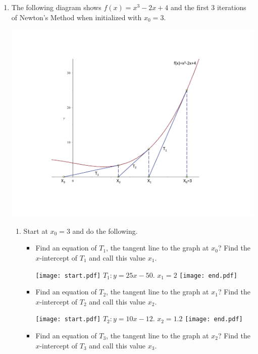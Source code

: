 \documentclass[12pt]{article}
\begin{document}
\begin{enumerate}

\item The following diagram shows $f(x)=x^3-2x+4$ and the first 3 iterations of Newton's Method when initialized with $x_0=3$.

\begin{center}
\includegraphics[scale=0.5]{newton1.pdf}
\end{center}

\begin{enumerate}

\item Start at $x_0=3$ and do the following.  

\begin{itemize}

\item Find an equation of $T_1$, the tangent line to the graph at $x_0$?  Find the $x$-intercept of $T_1$ and call this value $x_1$. 

\texttt{[image: start.pdf]}
{{$T_1: y=25x-50$. $x_1=2$}}
\texttt{[image: end.pdf]}


\item Find an equation of $T_2$, the tangent line to the graph at $x_1$?  Find the $x$-intercept of $T_2$ and call this value $x_2$.

\texttt{[image: start.pdf]}
{{$T_2: y=10x-12$. $x_2=1.2$}}
\texttt{[image: end.pdf]}


\item Find an equation of $T_3$, the tangent line to the graph at $x_2$?  Find the $x$-intercept of $T_3$ and call this value $x_3$.


\end{itemize}
\end{enumerate}
\end{enumerate}
\end{document}
